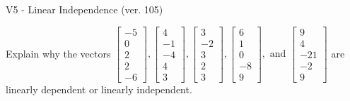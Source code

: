 \begin{exercise}
  \begin{exerciseTitle}V5 - Linear Independence (ver. 105)\end{exerciseTitle}
  \begin{exerciseStatement}
    Explain why the vectors \(\left[\begin{array}{r}
-5 \\
0 \\
2 \\
2 \\
-6
\end{array}\right] , \left[\begin{array}{r}
4 \\
-1 \\
-4 \\
4 \\
3
\end{array}\right] , \left[\begin{array}{r}
3 \\
-2 \\
3 \\
2 \\
3
\end{array}\right] , \left[\begin{array}{r}
6 \\
1 \\
0 \\
-8 \\
9
\end{array}\right] , \text{ and } \left[\begin{array}{r}
9 \\
4 \\
-21 \\
-2 \\
9
\end{array}\right]\) are linearly dependent or linearly independent.	



\end{exerciseStatement}
\end{exercise}
